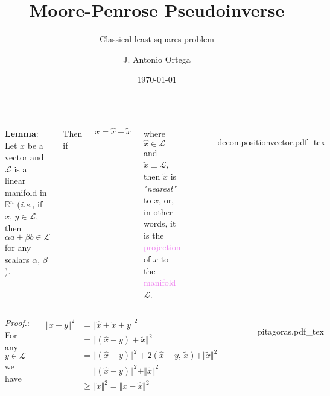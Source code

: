 \documentclass[aspectratio=169]{beamer}
\title[Penrose Pseudoinverse]{Moore-Penrose Pseudoinverse}
\subtitle{Classical least squares problem}
\author{J. Antonio Ortega}
\institute{UNAM}
\date{\today}
\newcommand{\incfig}[2][1]{%
    \def\svgwidth{#1\columnwidth}
    {#2.pdf_tex} }
\begin{document}

\frame{\titlepage}

\begin{frame} %

\begin{columns}

		
{\color{violet} \textbf{Lemma}:} Let $x$ be a vector and $\mathcal{L}$ is a linear manifold in $\mathbb{R}^n$
(\textit{i.e., } if $x, \, y \in \mathcal{L}$, then $\alpha a + \beta b \in \mathcal{L}$ for any scalars $\alpha, \, \beta$).

Then if

\[ x = \hat{x} + \tilde{x} \]

\noindent where $\hat{x} \in \mathcal{L}$ and $\tilde{x} \perp \mathcal{L}$,
then $\tilde{x}$ is \textit{"nearest"} to $x$, or, in other words, it is the \textcolor{violet}{projection}
of $x$ to the \textcolor{violet}{manifold} $\mathcal{L}$.
		

\begin{figure}[ht]
    \centering
    \incfig{decompositionvector}
    \label{fig:decompositionvector}
\end{figure}

\end{columns}
	
\end{frame}

\begin{frame}{} %
	
	\begin{columns}
	
	

{\color{violet} \textit{Proof.}:} For any $y \in \mathcal{L}$ we have

\begin{align*}
	\Vert x-y \Vert^2 &=  \Vert \hat{x} + \tilde{x} + y \Vert^2\\ 
	&= \Vert (\hat{x}-y) + \tilde{x} \Vert^2 \\
	&= \Vert (\hat{x}-y) \Vert^2  + 2(\hat{x}-y,\, \tilde{x})+ \Vert \tilde{x} \Vert^2\\ 
	&= \Vert (\hat{x}-y) \Vert^2 + \Vert \tilde{x} \Vert^2 \\
	& \geq \Vert \tilde{x} \Vert^2 = \Vert x -\hat{x} \Vert^2
\end{align*}
		
		
\begin{figure}[ht]
    \centering
    \incfig{pitagoras}
    \label{fig:pitagoras}
\end{figure}

\end{columns}

\end{frame}
\end{document}

